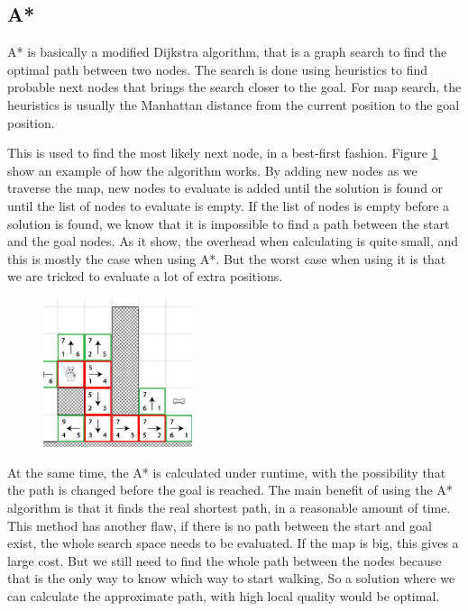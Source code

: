 \documentclass[12 pt]{article} %
\begin{document}
\subsection{A*}
A* is basically a modified Dijkstra algorithm, that is a graph search to find the optimal path between two nodes. 
The search is done using heuristics to find probable next nodes that brings the search closer to the goal. 
For map search, the heuristics is usually the Manhattan distance from the current position to the goal position.

This is used to find the most likely next node, in a best-first fashion.
Figure \ref{fig:astarcat} show an example of how the algorithm works.
By adding new nodes as we traverse the map, new nodes to evaluate is added until the solution is found or until the list of nodes to evaluate is empty.
If the list of nodes is empty before a solution is found, we know that it is impossible to find a path between the start and the goal nodes.
As it show, the overhead when calculating is quite small, and this is mostly the case when using A*.
But the worst case when using it is that we are tricked to evaluate a lot of extra positions.
\begin{figure}
	{\includegraphics[width=0.39\textwidth]{fig/astarcat.jpg}}
	\label{fig:astarcat}
\end{figure}
At the same time, the A* is calculated under runtime, with the possibility that the path is changed before the goal is reached.
The main benefit of using the A* algorithm is that it finds the real shortest path, in a reasonable amount of time.
This method has another flaw, if there is no path between the start and goal exist, the whole search space needs to be evaluated.
If the map is big, this gives a large cost.
But we still need to find the whole path between the nodes because that is the only way to know which way to start walking.
So a solution where we can calculate the approximate path, with high local quality would be optimal.\\
\end{document}
